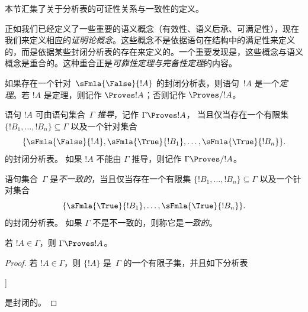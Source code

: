 \documentclass[../../../include/open-logic-section]{subfiles}
\begin{document}
      {}
      {}


\begin{editorial}
本节汇集了关于分析表的可证性关系与一致性的定义。
\end{editorial}

\begin{explain}
正如我们已经定义了一些重要的语义概念（有效性、语义后承、可满足性），现在我们来定义相应的\emph{证明论概念}。这些概念不是依据语句在结构中的满足性来定义的，而是依据某些封闭分析表的存在来定义的。一个重要发现是，这些概念与语义概念是重合的。这种重合正是\emph{可靠性定理与完备性定理}的内容。
\end{explain}

\begin{defn}[定理]
如果存在一个针对~$\sFmla{\False}{!A}$ 的封闭分析表，则语句~$!A$ 是一个\emph{定理}。若 $!A$ 是定理，则记作 $\Proves !A$；否则记作 $\Proves/ !A$。
\end{defn}

\begin{defn}[可推导性]
语句 $!A$ 可由语句集合~$\Gamma$ \emph{推导}，记作 $\Gamma \Proves !A$，
当且仅当存在一个有限集 $\{!B_1, \dots, !B_n\} \subseteq \Gamma$
以及一个针对集合
\[
\{
  \sFmla{\False}{!A},
  \sFmla{\True}{!B_1}, \dots,
  \sFmla{\True}{!B_n}
  \}.
\]
的封闭分析表。
如果 $!A$ 不能由 $\Gamma$ 推导，则记作 $\Gamma \Proves/ !A$。
\end{defn}

\begin{defn}[一致性]
语句集合~$\Gamma$ 是\emph{不一致的}，当且仅当存在一个有限集 $\{!B_1, \dots, !B_n\} \subseteq \Gamma$
以及一个针对集合
\[
\{
  \sFmla{\True}{!B_1}, \dots,
  \sFmla{\True}{!B_n}
  \}.
\]
的封闭分析表。
如果 $\Gamma$ 不是不一致的，则称它是\emph{一致的}。
\end{defn}

\begin{prop}[自反性]
若 $!A \in \Gamma$，则 $\Gamma \Proves !A$。
\end{prop}

\begin{proof}
若 $!A \in \Gamma$，则 $\{!A\}$ 是~$\Gamma$ 的一个有限子集，并且如下分析表
\begin{oltableau}
  [\sFmla{\False}{\formula{A}}, just = \TAss
    [\sFmla{\True}{\formula{A}}, just = \TAss,close]
  ]
\end{oltableau}
是封闭的。
\end{proof}
\end{document}
